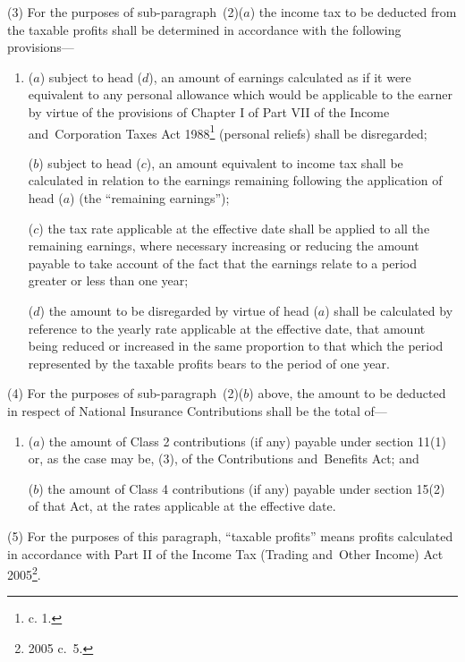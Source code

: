 \documentclass[12pt,a4paper]{article}
\begin{document}
(3) For the purposes of sub-paragraph~(2)($a$) the income tax to be deducted from the 
taxable profits shall be determined in accordance with the following provisions—
\begin{enumerate}\item[]
($a$) subject to head ($d$), an amount of earnings 
calculated as if it were equivalent to any personal allowance which would be  %
applicable to the earner by virtue of the provisions of Chapter I of Part VII of the Income and~Corporation Taxes Act 1988\footnote{ c. 1.} (personal reliefs) shall be disregarded;

($b$) subject to head ($c$), an amount equivalent to income tax shall be calculated in relation to the earnings remaining following the application of head ($a$) (the “remaining earnings”);

($c$) the tax rate applicable at the effective date shall be applied to all the remaining earnings, where necessary increasing or reducing the amount payable to take account of the fact that the earnings relate to a period greater or less than one year;

($d$) the amount to be disregarded by virtue of head ($a$) shall be calculated by reference to the yearly rate applicable at the effective date, that amount being reduced or increased in the same proportion to that which the period represented by the taxable profits bears to the period of one year.
\end{enumerate}

(4) For the purposes of sub-paragraph~(2)($b$) above, the amount to be deducted in respect of National Insurance Contributions shall be the total of—
\begin{enumerate}\item[]
($a$) the amount of Class 2 contributions (if any) payable under section 11(1) or, as the case may be, (3), of the Contributions and~Benefits Act; and

($b$) the amount of Class 4 contributions (if any) payable under section 15(2) of that Act,
at the rates applicable at the effective date.
\end{enumerate}

(5) For the purposes of this paragraph, “taxable profits” means profits calculated in accordance with Part II of the Income Tax (Trading and~Other Income) Act 2005\footnote{2005 c.\ 5.}.
\end{document}
